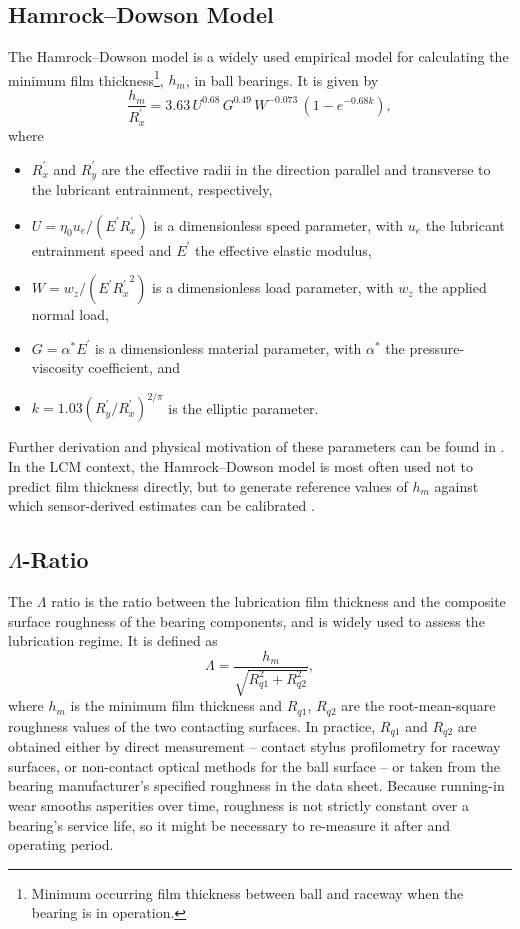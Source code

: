 \subsection{Hamrock--Dowson Model}
\label{subsec:hamrock_dowson}
The Hamrock--Dowson model is a widely used empirical model for calculating the minimum film thickness\footnote{Minimum occurring film thickness between ball and raceway when the bearing is in operation.}, $h_m$, in ball bearings. It is given by
\begin{equation}
    \frac{h_m}{R_{x}^{'}} = 3.63\,U^{0.68}\,G^{0.49}\,W^{-0.073}\,(1-e^{-0.68k}),
\end{equation}
where
\begin{itemize}
    \item $R^{'}_{x}$ and $R^{'}_{y}$ are the effective radii in the direction parallel and transverse to the lubricant entrainment, respectively,
    \item $U=\eta_0 u_e/(E^{'}R^{'}_{x})$ is a dimensionless speed parameter, with $u_e$ the lubricant entrainment speed and $E^{'}$ the effective elastic modulus,
    \item $W=w_z/(E^{'}{R^{'}_{x}}^{2})$ is a dimensionless load parameter, with $w_z$ the applied normal load,
    \item $G=\alpha^*E^{'}$ is a dimensionless material parameter, with $\alpha^*$ the pressure-viscosity coefficient, and
    \item $k=1.03(R_{y}^{'}/R_{x}^{'})^{2/\pi}$ is the elliptic parameter.
\end{itemize}
Further derivation and physical motivation of these parameters can be found in \cite{cen_ehl_2021,hansen_new_2021,maruyama_lubrication_2019,noauthor_elasto-hydrodynamic_1977}. In the LCM context, the Hamrock--Dowson model is most often used not to predict film thickness directly, but to generate reference values of $h_m$ against which sensor-derived estimates can be calibrated \cite{jakobsen_detecting_2023,hou_-situ_2025,jablonka_quantitative_2018}.

\subsection{$\Lambda$-Ratio}
\label{subsec:lambda}
The $\Lambda$ ratio is the ratio between the lubrication film thickness and the composite surface roughness of the bearing components, and is widely used to assess the lubrication regime. It is defined as
\begin{equation}
\Lambda = \frac{h_{m}}{\sqrt{R_{q1}^2 + R_{q2}^2}},
\end{equation}
where $h_{m}$ is the minimum film thickness and $R_{q1}$, $R_{q2}$ are the root-mean-square roughness values of the two contacting surfaces. In practice, $R_{q1}$ and $R_{q2}$ are obtained either by direct measurement -- contact stylus profilometry for raceway surfaces, or non-contact optical methods for the ball surface -- or taken from the bearing manufacturer's specified roughness in the data sheet. Because running-in wear smooths asperities over time, roughness is not strictly constant over a bearing's service life, so it might be necessary to re-measure it after and operating period.

